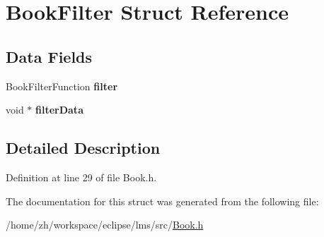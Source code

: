 \hypertarget{structBookFilter}{\section{Book\-Filter Struct Reference}
\label{structBookFilter}
}
\subsection*{Data Fields}
\begin{DoxyCompactItemize}
\item 
\hypertarget{structBookFilter_a6cb4dbc86cbaf45630c34c5bab5be904}{Book\-Filter\-Function {\bfseries filter}}\label{structBookFilter_a6cb4dbc86cbaf45630c34c5bab5be904}

\item 
\hypertarget{structBookFilter_acb1597eef5b7936e2863a3d180e6cf85}{void $\ast$ {\bfseries filter\-Data}}\label{structBookFilter_acb1597eef5b7936e2863a3d180e6cf85}

\end{DoxyCompactItemize}


\subsection{Detailed Description}


Definition at line 29 of file Book.\-h.



The documentation for this struct was generated from the following file\-:\begin{DoxyCompactItemize}
\item 
/home/zh/workspace/eclipse/lms/src/\hyperlink{Book_8h}{Book.\-h}\end{DoxyCompactItemize}
